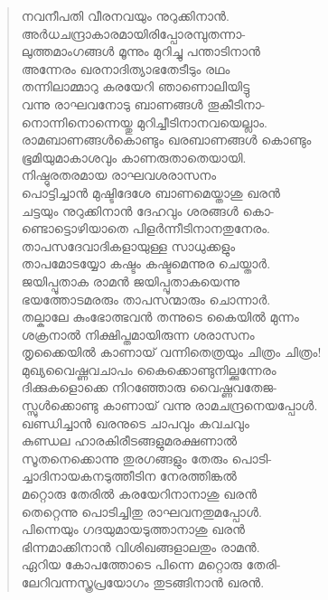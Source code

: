 \begin{verse}
നവനീപതി വീരനവയും നുറുക്കിനാന്‍.\\
അര്‍ധചന്ദ്രാകാരമായിരിപ്പോരമ്പുതന്നാ-\\
ലുത്തമാംഗങ്ങള്‍ മൂന്നും മുറിച്ചു പന്താടിനാന്‍\\
അന്നേരം ഖരനാദിത്യാഭതേടീടും രഥം\\
തന്നിലാമ്മാറു കരയേറി ഞാണൊലിയിട്ടു\\
വന്നു രാഘവനോടു ബാണങ്ങള്‍ തൂകീടിനാ-\\
നൊന്നിനൊന്നെയ്തു മുറിച്ചീടിനാനവയെല്ലാം.\\
രാമബാണങ്ങള്‍കൊണ്ടും ഖരബാണങ്ങള്‍ കൊണ്ടും\\
ഭൂമിയുമാകാശവും കാണരുതാതെയായി.\\
നിഷ്ഠുരതരമായ രാഘവശരാസനം\\
പൊട്ടിച്ചാന്‍ മുഷ്ടിദേശേ ബാണമെയ്താശു ഖരന്‍\\
ചട്ടയും നുറുക്കിനാന്‍ ദേഹവും ശരങ്ങള്‍ കൊ-\\
ണ്ടൊട്ടൊഴിയാതെ പിളര്‍ന്നീടിനാനതുനേരം.\\
താപസദേവാദികളായുള്ള സാധുക്കളും\\
താപമോടയ്യോ കഷ്ടം കഷ്ടമെന്നുര ചെയ്താര്‍.\\
ജയിപ്പൂതാക രാമന്‍ ജയിപ്പൂതാകയെന്നു\\
ഭയത്തോടമരരും താപസന്മാരും ചൊന്നാര്‍.\\
തല്കാലേ കുംഭോത്ഭവന്‍ തന്നുടെ കൈയില്‍ മുന്നം\\
ശക്രനാല്‍ നിക്ഷിപ്തമായിരുന്ന ശരാസനം\\
തൃക്കൈയില്‍ കാണായ് വന്നിതെത്രയും ചിത്രം ചിത്രം!\\
മുഖ്യവൈഷ്ണവചാപം കൈക്കൊണ്ടുനില്ക്കുന്നേരം\\
ദിക്കുകളൊക്കെ നിറഞ്ഞോരു വൈഷ്ണവതേജ-\\
സ്സുള്‍ക്കൊണ്ടു കാണായ് വന്നു രാമചന്ദ്രനെയപ്പോള്‍.\\
ഖണ്ഡിച്ചാന്‍ ഖരനുടെ ചാപവും കവചവും\\
കുണ്ഡല ഹാരകിരീടങ്ങളുമരക്ഷണാല്‍\\
സൂതനെക്കൊന്നു തുരഗങ്ങളും തേരും പൊടി-\\
ച്ചാദിനായകനടുത്തീടിന നേരത്തിങ്കല്‍\\
മറ്റൊരു തേരില്‍ കരയേറിനാനാശു ഖരന്‍\\
തെറ്റെന്നു പൊടിച്ചിതു രാഘവനതുമപ്പോള്‍.\\
പിന്നെയും ഗദയുമായടുത്താനാശു ഖരന്‍\\
ഭിന്നമാക്കിനാന്‍ വിശിഖങ്ങളാലതും രാമന്‍.\\
ഏറിയ കോപത്തോടെ പിന്നെ മറ്റൊരു തേരി-\\
ലേറിവന്നസ്ത്രപ്രയോഗം തുടങ്ങിനാന്‍ ഖരന്‍.\\

\end{verse}
